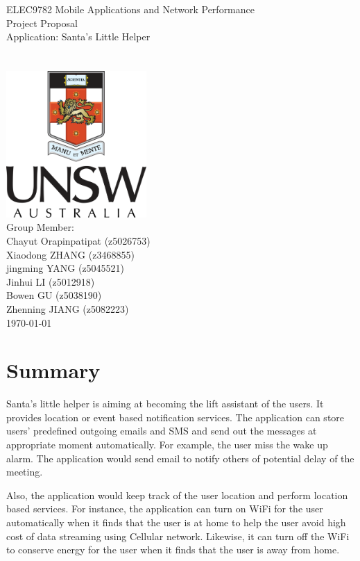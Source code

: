 \documentclass[a4paper,12pt]{article}
\author{Zhenning Jiang (z5082223)}
\date{\today}
\begin{document}
	\begin{titlepage}
		\begin{center}
			\Huge{
				ELEC9782 Mobile Applications and Network Performance\\
			}
			\Huge{
				Project Proposal\\
				[1cm]
				Application: Santa's Little Helper\\
			}
			\\
			[2cm]\\
			
			\includegraphics[width = 0.4\textwidth]{UNSW_coat_of_arms.png}\\
			[1.5cm]
			\Large{Group Member: \\
				Chayut Orapinpatipat (z5026753)\\
				Xiaodong ZHANG (z3468855) \\
				jingming YANG (z5045521)\\
				Jinhui LI (z5012918)\\
				Bowen GU (z5038190)\\
				Zhenning JIANG (z5082223)\\
				[0.7cm]
				\today\\
				[0.7cm]
			}		
		\end{center}
	\end{titlepage}
    \newpage
	
	\section{Summary}
	Santa's little helper is aiming at becoming the lift assistant of the users. It provides location or event based notification services. The application can store users' predefined outgoing emails and SMS and send out the messages at appropriate moment automatically. For example, the user miss the wake up alarm. The application would send email to notify others of potential delay of the meeting. 
	
	Also, the application would keep track of the user location and perform location based services. For instance, the application can turn on WiFi for the user automatically when it finds that the user is at home to help the user avoid high cost of data streaming using Cellular network. Likewise, it can turn off the WiFi to conserve energy for the user when it finds that the user is away from home. 
	
\end{document}
